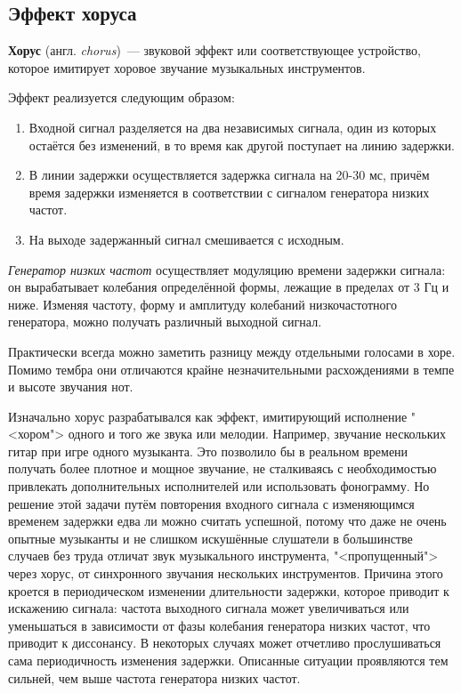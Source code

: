 \documentclass[oneside, final, 14pt]{extreport}
\begin{document}
\subsection{Эффект хоруса}
\textbf{Хорус} (англ. \textit{chorus})~--- звуковой эффект или соответствующее устройство, которое имитирует хоровое звучание музыкальных инструментов.

Эффект реализуется следующим образом:
\begin{enumerate}
  \item Входной сигнал разделяется на два независимых сигнала, один из которых остаётся без изменений, в то время как другой поступает на линию задержки.
  \item В линии задержки осуществляется задержка сигнала на 20-30 мс, причём время задержки изменяется в соответствии с сигналом генератора низких частот.
  \item На выходе задержанный сигнал смешивается с исходным.
\end{enumerate}

\emph{Генератор низких частот} осуществляет модуляцию времени задержки сигнала: он вырабатывает колебания определённой формы, лежащие в пределах от 3 Гц и ниже. Изменяя частоту, форму и амплитуду колебаний низкочастотного генератора, можно получать различный выходной сигнал.

Практически всегда можно заметить разницу между отдельными голосами в хоре. Помимо тембра они отличаются крайне незначительными расхождениями в темпе и высоте звучания нот.

Изначально хорус разрабатывался как эффект, имитирующий исполнение "<хором"> одного и того же звука или мелодии. Например, звучание нескольких гитар при игре одного музыканта. Это позволило бы в реальном времени получать более плотное и мощное звучание, не сталкиваясь с необходимостью привлекать дополнительных исполнителей или использовать фонограмму. Но решение этой задачи путём повторения входного сигнала с изменяющимся временем задержки едва ли можно считать успешной, потому что даже не очень опытные музыканты и не слишком искушённые слушатели в большинстве случаев без труда отличат звук музыкального инструмента, "<пропущенный"> через хорус, от синхронного звучания нескольких инструментов. Причина этого кроется в периодическом изменении длительности задержки, которое приводит к искажению сигнала: частота выходного сигнала может увеличиваться или уменьшаться в зависимости от фазы колебания генератора низких частот, что приводит к диссонансу. В некоторых случаях может отчетливо прослушиваться сама периодичность изменения задержки. Описанные ситуации проявляются тем сильней, чем выше частота генератора низких частот.
\end{document}
